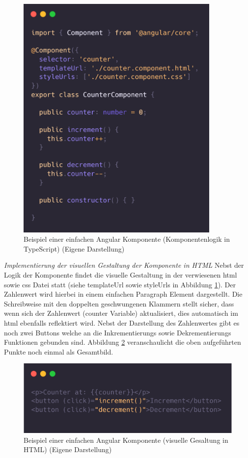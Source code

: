 \begin{figure}[h]
    \includegraphics[width=10cm]{images/angular_component_ts.png}
    \centering
    \caption{Beispiel einer einfachen Angular Komponente (Komponentenlogik in TypeScript) (Eigene Darstellung)}
    \label{fig:angular_component_ts}
\end{figure}

\clearpage
\noindent
\textit{Implementierung der visuellen Gestaltung der Komponente in HTML}
\newline
\indent
Nebst der Logik der Komponente findet die visuelle Gestaltung in der verwiesenen \gls{html} sowie \gls{css} Datei statt (siehe templateUrl sowie styleUrls in Abbildung \ref{fig:angular_component_ts}). Der Zahlenwert wird hierbei in einem einfachen Paragraph Element dargestellt. Die Schreibweise mit den doppelten geschwungenen Klammern stellt sicher, dass wenn sich der Zahlenwert (counter Variable) aktualisiert, dies automatisch im \gls{html} ebenfalls reflektiert wird. Nebst der Darstellung des Zahlenwertes gibt es noch zwei Buttons welche an die Inkrementierungs sowie Dekrementierungs Funktionen gebunden sind. Abbildung \ref{fig:angular_component_html} veranschaulicht die oben aufgeführten Punkte noch einmal als Gesamtbild.

\begin{figure}[h]
    \includegraphics[width=12cm]{images/angular_component_html.png}
    \centering
    \caption{Beispiel einer einfachen Angular Komponente (visuelle Gesaltung in HTML) (Eigene Darstellung)}
    \label{fig:angular_component_html}
\end{figure}

